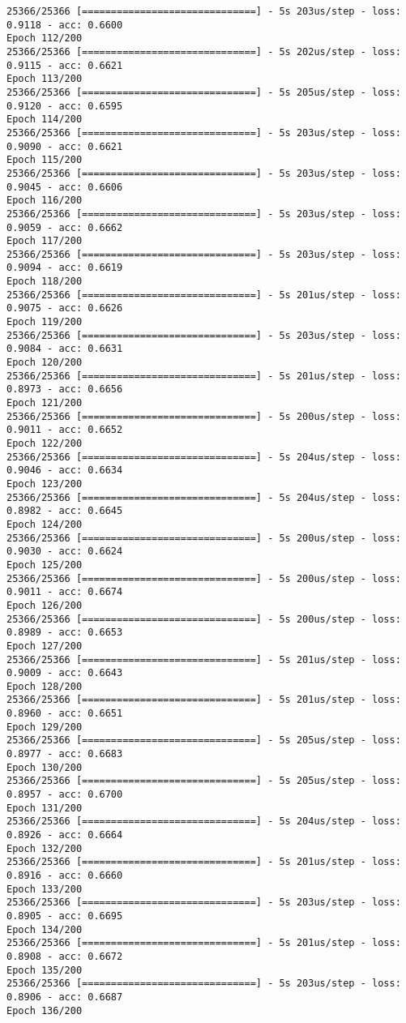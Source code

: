 \documentclass[11pt]{article}
\begin{document}
\begin{Verbatim}[commandchars=\\\{\}]
25366/25366 [==============================] - 5s 203us/step - loss: 0.9118 - acc: 0.6600
Epoch 112/200
25366/25366 [==============================] - 5s 202us/step - loss: 0.9115 - acc: 0.6621
Epoch 113/200
25366/25366 [==============================] - 5s 205us/step - loss: 0.9120 - acc: 0.6595
Epoch 114/200
25366/25366 [==============================] - 5s 203us/step - loss: 0.9090 - acc: 0.6621
Epoch 115/200
25366/25366 [==============================] - 5s 203us/step - loss: 0.9045 - acc: 0.6606
Epoch 116/200
25366/25366 [==============================] - 5s 203us/step - loss: 0.9059 - acc: 0.6662
Epoch 117/200
25366/25366 [==============================] - 5s 203us/step - loss: 0.9094 - acc: 0.6619
Epoch 118/200
25366/25366 [==============================] - 5s 201us/step - loss: 0.9075 - acc: 0.6626
Epoch 119/200
25366/25366 [==============================] - 5s 203us/step - loss: 0.9084 - acc: 0.6631
Epoch 120/200
25366/25366 [==============================] - 5s 201us/step - loss: 0.8973 - acc: 0.6656
Epoch 121/200
25366/25366 [==============================] - 5s 200us/step - loss: 0.9011 - acc: 0.6652
Epoch 122/200
25366/25366 [==============================] - 5s 204us/step - loss: 0.9046 - acc: 0.6634
Epoch 123/200
25366/25366 [==============================] - 5s 204us/step - loss: 0.8982 - acc: 0.6645
Epoch 124/200
25366/25366 [==============================] - 5s 200us/step - loss: 0.9030 - acc: 0.6624
Epoch 125/200
25366/25366 [==============================] - 5s 200us/step - loss: 0.9011 - acc: 0.6674
Epoch 126/200
25366/25366 [==============================] - 5s 200us/step - loss: 0.8989 - acc: 0.6653
Epoch 127/200
25366/25366 [==============================] - 5s 201us/step - loss: 0.9009 - acc: 0.6643
Epoch 128/200
25366/25366 [==============================] - 5s 201us/step - loss: 0.8960 - acc: 0.6651
Epoch 129/200
25366/25366 [==============================] - 5s 205us/step - loss: 0.8977 - acc: 0.6683
Epoch 130/200
25366/25366 [==============================] - 5s 205us/step - loss: 0.8957 - acc: 0.6700
Epoch 131/200
25366/25366 [==============================] - 5s 204us/step - loss: 0.8926 - acc: 0.6664
Epoch 132/200
25366/25366 [==============================] - 5s 201us/step - loss: 0.8916 - acc: 0.6660
Epoch 133/200
25366/25366 [==============================] - 5s 203us/step - loss: 0.8905 - acc: 0.6695
Epoch 134/200
25366/25366 [==============================] - 5s 201us/step - loss: 0.8908 - acc: 0.6672
Epoch 135/200
25366/25366 [==============================] - 5s 203us/step - loss: 0.8906 - acc: 0.6687
Epoch 136/200

\end{Verbatim}
\end{document}
